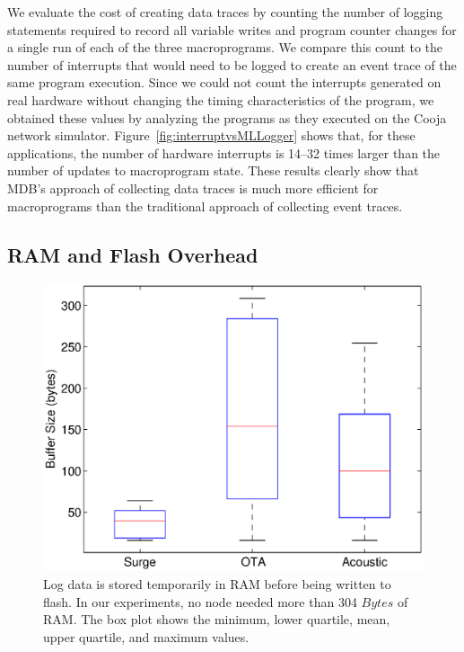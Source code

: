 We evaluate the cost of creating data traces by counting the number of logging statements
required to record all variable writes and program counter changes for a single
run of each of the three macroprograms. We compare this count to the number of
interrupts that would need to be logged to create an event trace of the same
program execution.  Since we could not count the interrupts generated on real
hardware without changing the timing characteristics of the program, we obtained
these values by analyzing the programs as they executed on the Cooja network
simulator.  Figure~\ref{fig:interruptvsMLLogger} shows that, for these
applications, the number of hardware interrupts is 14--32 times larger than the
number of updates to macroprogram state.  These results clearly show that MDB's
approach of collecting data traces is much more efficient for macroprograms than
the traditional approach of collecting event traces.

\subsection{RAM and Flash Overhead} \label{overhead}

\begin{figure}[t]
  \centering
  \includegraphics[scale=0.75]{fig/bufferSize}
  \caption[RAM Overhead]{Log data is stored temporarily in RAM before being written to flash.
    In our experiments, no node needed more than 304 $Bytes$ of RAM\@. The box plot
    shows the minimum, lower quartile, mean, upper quartile, and maximum
    values.}
  \label{fig:bufferSize}
\end{figure}


